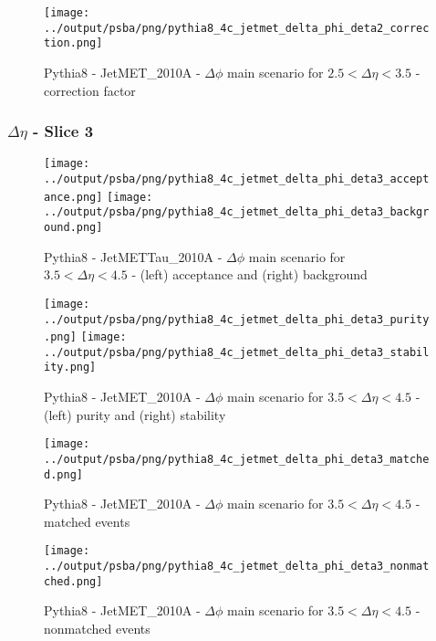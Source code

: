\documentclass[11pt]{book}
\begin{document}
\begin{figure}[ht]
\centering
\texttt{[image: ../output/psba/png/pythia8\_4c\_jetmet\_delta\_phi\_deta2\_correction.png]}
\caption{Pythia8 - JetMET\_2010A - $\Delta\phi$ main scenario for $2.5 < \Delta\eta < 3.5$ - correction factor}
\label{fig:p8_jetmet_delta_phi_deta2_correction}
\end{figure}

\clearpage
\subsubsection{$\Delta\eta$ - Slice 3}

\begin{figure}[ht]
\centering
\texttt{[image: ../output/psba/png/pythia8\_4c\_jetmet\_delta\_phi\_deta3\_acceptance.png]}
\texttt{[image: ../output/psba/png/pythia8\_4c\_jetmet\_delta\_phi\_deta3\_background.png]}
\caption{Pythia8 - JetMETTau\_2010A - $\Delta\phi$ main scenario for $3.5 < \Delta\eta < 4.5$ - (left) acceptance and (right) background}
\label{fig:p8_jetmet_delta_phi_deta3_ab}
\end{figure}

\begin{figure}[ht]
\centering
\texttt{[image: ../output/psba/png/pythia8\_4c\_jetmet\_delta\_phi\_deta3\_purity.png]}
\texttt{[image: ../output/psba/png/pythia8\_4c\_jetmet\_delta\_phi\_deta3\_stability.png]}
\caption{Pythia8 - JetMET\_2010A - $\Delta\phi$ main scenario for $3.5 < \Delta\eta < 4.5$ - (left) purity and (right) stability}
\label{fig:p6_jetmet_delta_phi_deta3_ps}
\end{figure}

\begin{figure}[ht]
\centering
\texttt{[image: ../output/psba/png/pythia8\_4c\_jetmet\_delta\_phi\_deta3\_matched.png]}
\caption{Pythia8 - JetMET\_2010A - $\Delta\phi$ main scenario for $3.5 < \Delta\eta < 4.5$ - matched events}
\label{fig:p8_jetmet_delta_phi_deta3_matched}
\end{figure}

\begin{figure}[ht]
\centering
\texttt{[image: ../output/psba/png/pythia8\_4c\_jetmet\_delta\_phi\_deta3\_nonmatched.png]}
\caption{Pythia8 - JetMET\_2010A - $\Delta\phi$ main scenario for $3.5 < \Delta\eta < 4.5$ - nonmatched events}
\label{fig:p8_jetmet_delta_phi_deta3_nonmatched}
\end{figure}
\end{document}
